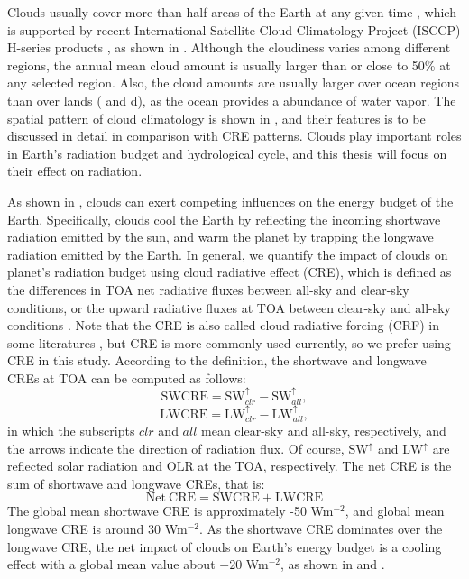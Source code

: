 Clouds usually cover more than half areas of the Earth at any given time \citep{Houze2014,Ramanathan1989}, which is supported by recent International Satellite Cloud Climatology Project (ISCCP) H-series products \citep{Young2018}, as shown in . Although the cloudiness varies among different regions, the annual mean cloud amount is usually larger than or close to 50\% at any selected region. Also, the cloud amounts are usually larger over ocean regions than over lands ( and d), as the ocean provides a abundance of water vapor. The spatial pattern of cloud climatology is shown in , and their features is to be discussed in detail in comparison with CRE patterns. Clouds play important roles in Earth's radiation budget and hydrological cycle, and this thesis will focus on their effect on radiation.

As shown in , clouds can exert competing influences on the energy budget of the Earth. Specifically, clouds cool the Earth by reflecting the incoming shortwave radiation emitted by the sun, and warm the planet by trapping the longwave radiation emitted by the Earth. In general, we quantify the impact of clouds on planet's radiation budget using cloud radiative effect  (CRE), which is defined as the differences in TOA net radiative fluxes between all-sky and clear-sky conditions, or the upward radiative fluxes at TOA between clear-sky and all-sky conditions \citep[e.g.,][]{Ramanathan1989,Soden2004,Soden2008,Li2017}. Note that the CRE is also called cloud radiative forcing (CRF) in some literatures \citep[e.g.,][]{Ramanathan1989}, but CRE is more commonly used currently, so we prefer using CRE in this study. According to the definition, the shortwave and longwave CREs at TOA can be computed as follows:
\begin{equation}
    \mathrm{SWCRE} = \mathrm{SW}_{clr}^{\uparrow} - \mathrm{SW}_{all}^{\uparrow},
    \label{eq:swcre}
\end{equation}
\begin{equation}
    \mathrm{LWCRE} = \mathrm{LW}_{clr}^{\uparrow} - \mathrm{LW}_{all}^{\uparrow},
    \label{eq:lwcre}
\end{equation}
in which the subscripts $clr$ and $all$ mean clear-sky and all-sky, respectively, and the arrows indicate the direction of radiation flux. Of course, $\mathrm{SW}^{\uparrow}$ and $\mathrm{LW}^{\uparrow}$ are reflected solar radiation and OLR at the TOA, respectively. The net CRE is the sum of shortwave and longwave CREs, that is:
\begin{equation}
    \mathrm{Net~CRE} = \mathrm{SWCRE} + \mathrm{LWCRE}
    \label{eq:net_cre}
\end{equation}
The global mean shortwave CRE is approximately -50 Wm$^{-2}$, and global mean longwave CRE is around 30 Wm$^{-2}$. As the shortwave CRE dominates over the longwave CRE, the net impact of clouds on Earth's energy budget is a cooling effect with a global mean value about $-20$ Wm$^{-2}$, as shown in  and .

